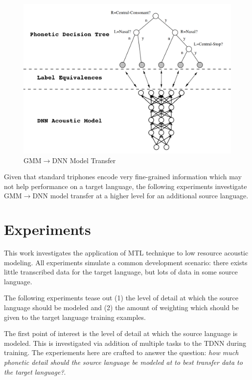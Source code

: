 \documentclass[a4paper]{article}
\begin{document}
\begin{figure}[!htb]
  \centering
{}
  \includegraphics[width=\linewidth]{figs/tree-net.png}
  \caption{GMM$\rightarrow$DNN Model Transfer}
\endminipage\hfill
\end{figure}


Given that standard triphones encode very fine-grained information which may not help performance on a target language, the following experiments investigate GMM$\rightarrow$DNN model transfer at a higher level for an additional source language. 


\section{Experiments}

This work investigates the application of MTL technique to low resource acoustic modeling. All experiments simulate a common development scenario: there exists little transcribed data for the target language, but lots of data in some source language.

The following experiments tease out (1) the level of detail at which the source language should be modeled and (2) the amount of weighting which should be given to the target language training examples.

The first point of interest is the level of detail at which the source language is modeled. This is investigated via addition of multiple tasks to the TDNN during training. The experiements here are crafted to answer the question: \textit{how much phonetic detail should the source language be modeled at to best transfer data to the target language?}.
\end{document}
